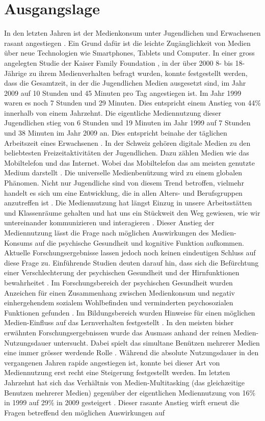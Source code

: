 \section{Ausgangslage}\label{section.einleitung.ausgangslage}
In den letzten Jahren ist der Medienkonsum unter Jugendlichen und Erwachsenen rasant angestiegen \cite{Shih2013}. Ein Grund dafür ist die leichte Zugänglichkeit von Medien über neue Technologien wie Smartphones, Tablets und Computer. In einer gross angelegten Studie der Kaiser Family Foundation \cite{Rideout2010}, in der über 2000 8- bis 18-Jährige zu ihrem Medienverhalten befragt wurden, konnte festgestellt werden, dass die Gesamtzeit, in der die Jugendlichen Medien ausgesetzt sind, im Jahr 2009 auf 10 Stunden und 45 Minuten pro Tag angestiegen ist. Im Jahr 1999 waren es noch 7 Stunden und 29 Minuten. Dies entspricht einem Anstieg von 44\% innerhalb von einem Jahrzehnt. Die eigentliche Mediennutzung dieser Jugendlichen stieg von 6 Stunden und 19 Minuten im Jahr 1999 auf 7 Stunden und 38 Minuten im Jahr 2009 an. Dies entspricht beinahe der täglichen Arbeitszeit eines Erwachsenen \cite{Rideout2010}. In der Schweiz gehören digitale Medien zu den beliebtesten Freizeitaktivitäten der Jugendlichen. Dazu zählen Medien wie das Mobiltelefon und das Internet. Wobei das Mobiltelefon das am meisten genutzte Medium darstellt \cite{Willemse2012}. Die universelle Medienbenützung wird zu einem globalen Phänomen. Nicht nur Jugendliche sind von diesem Trend betroffen, vielmehr handelt es sich um eine Entwicklung, die in allen Alters- und Berufsgruppen anzutreffen ist \cite{Rogers2009}. Die Mediennutzung hat längst Einzug in unsere Arbeitsstätten und Klassenräume gehalten und hat uns ein Stückweit den Weg gewiesen, wie wir untereinander kommunizieren und interagieren \cite{Benson2002}. Dieser Anstieg der Mediennutzung lässt die Frage nach möglichen Auswirkungen des Medien-Konsums auf die psychische Gesundheit und kognitive Funktion aufkommen. Aktuelle Forschungsergebnisse lassen jedoch noch keinen eindeutigen Schluss auf diese Frage zu. Einführende Studien deuten darauf hin, dass sich die Befürchtung einer Verschlechterung der psychischen Gesundheit und der Hirnfunktionen bewahrheitet \cite{Biocca2000, Roberts2008}. Im Forschungsbereich der psychischen Gesundheit wurden Anzeichen für einen Zusammenhang zwischen Medienkonsum und negativ einhergehendem sozialem Wohlbefinden und verminderten psychosozialen Funktionen gefunden \cite{Kraut1998, Moody2001}. Im Bildungsbereich wurden Hinweise für einen möglichen Medien-Einfluss auf das Lernverhalten festgestellt \cite{Prensky2001}. In den meisten bisher erwähnten Forschungsergebnissen wurde das Ausmass anhand der reinen Medien-Nutzungsdauer untersucht. Dabei spielt das simultane Benützen mehrerer Medien eine immer grösser werdende Rolle \cite{Jeong2007}. Während die absolute Nutzungsdauer in den vergangenen Jahren rapide angestiegen ist, konnte bei dieser Art von Mediennutzung erst recht eine Steigerung festgestellt werden. Im letzten Jahrzehnt hat sich das Verhältnis von Medien-Multitasking (das gleichzeitige Benutzen mehrerer Medien) gegenüber der eigentlichen Mediennutzung von 16\% in 1999 auf 29\% in 2009 gesteigert \cite{Rideout2010}. Dieser rasante Anstieg wirft erneut die Fragen betreffend den möglichen Auswirkungen auf 